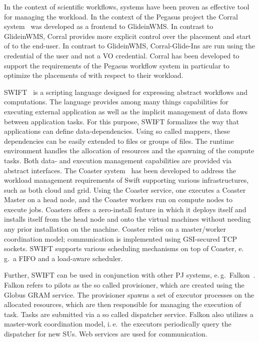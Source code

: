 \documentclass{sig-alternate}
\begin{document}
In the context of scientific workflows, \pilotjob systems have been
proven as effective tool for managing the workload. In the context of
the Pegasus project the Corral
system~\cite{Rynge:2011:EUG:2116259.2116599} was developed as a
frontend to GlideinWMS. In contrast to GlideinWMS, Corral provides
more explicit control over the placement and start of \pilots to the
end-user. In contrast to GlideinWMS, Corral-Glide-Ins are run using
the credential of the user and not a VO credential. Corral has been
developed to support the requirements of the Pegasus workflow system
in particular to optimize the placements of \pilots with respect to
their workload.

SWIFT~\cite{Wilde2011} is a scripting language designed for expressing
abstract workflows and computations. The language provides among many
things capabilities for executing external application as well as the
implicit management of data flows between application tasks. For this
purpose, SWIFT formalizes the way that applications can define
data-dependencies. Using so called mappers, these dependencies can be
easily extended to files or groups of files. The runtime environment
handles the allocation of resources and the spawning of the compute
tasks. Both data- and execution management capabilities are provided
via abstract interfaces. The Coaster system~\cite{coasters} has been
developed to address the workload management requirements of Swift
supporting various infrastructures, such as both cloud and grid. Using
the Coaster service, one executes a Coaster Master on a head node, and
the Coaster workers run on compute nodes to execute jobs.  Coasters
offers a zero-install feature in which it deploys itself and installs
itself from the head node and onto the virtual machines without
needing any prior installation on the machine. Coaster relies on a
master/worker coordination model; communication is implemented using
GSI-secured TCP sockets. SWIFT supports various scheduling mechanisms
on top of Coaster, e.\,g.\ a FIFO and a load-aware scheduler.

Further, SWIFT can be used in conjunction with other PJ systems,
e.\,g.\ Falkon~\cite{1362680}. Falkon refers to pilots as the so
called provisioner, which are created using the Globus GRAM
service. The provisioner spawns a set of executor processes on the
allocated resources, which are then responsible for managing the
execution of task. Tasks are submitted via a so called dispatcher
service. Falkon also utilizes a master-work coordination model,
i.\,e.\ the executors periodically query the dispatcher for new SUs.
Web services are used for communication.
\end{document}
